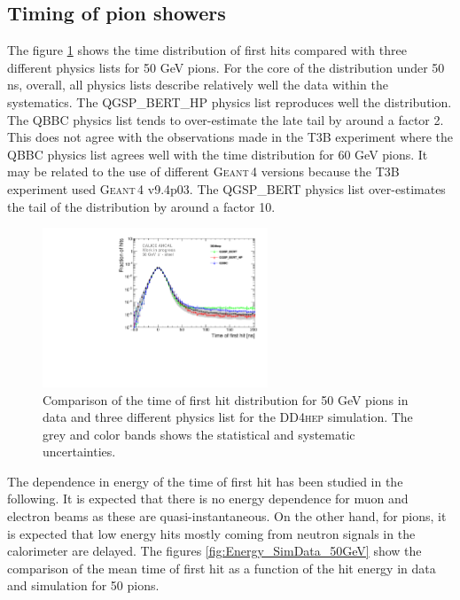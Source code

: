 \documentclass{JINST}
\newcommand\geant{\textsc{Geant\,4}\xspace}
\newcommand\ddhep{\textsc{DD4hep}\xspace}
\begin{document}
\subsection{Timing of pion showers}

The figure \ref{fig:dNdt_SimData_50GeV_DD4hep} shows the time distribution of first hits compared with three different physics lists for 50 GeV pions. For the core of the distribution under 50 ns, overall, all physics lists describe relatively well the data within the systematics. The QGSP\_BERT\_HP physics list reproduces well the distribution. The QBBC physics list tends to over-estimate the late tail by around a factor 2. This does not agree with the observations made in the T3B experiment \cite{Simon2013} where the QBBC physics list agrees well with the time distribution for 60 GeV pions. It may be related to the use of different \geant versions because the T3B experiment used \geant v9.4p03. The QGSP\_BERT physics list over-estimates the tail of the distribution by around a factor 10.

\begin{figure}[htbp!]
  \centering
  \includegraphics[width=0.6\textwidth]{fig/Comparison_SimData_Pion50GeV_LateClusters_DD4hep.pdf}
  \caption{Comparison of the time of first hit distribution for 50 GeV pions in data and three different physics list for the \ddhep simulation. The grey and color bands shows the statistical and systematic uncertainties.}
  \label{fig:dNdt_SimData_50GeV_DD4hep}
\end{figure}

The dependence in energy of the time of first hit has been studied in the following. It is expected that there is no energy dependence for muon and electron beams as these are quasi-instantaneous. On the other hand, for pions, it is expected that low energy hits mostly coming from neutron signals in the calorimeter are delayed. The figures \ref{fig:Energy_SimData_50GeV} show the comparison of the mean time of first hit as a function of the hit energy in data and simulation for 50 pions.
\end{document}
